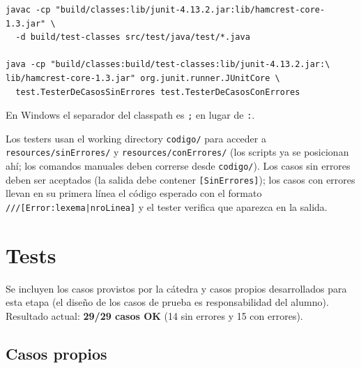 \documentclass[11pt,a4paper]{article}
\begin{document}
{\footnotesize
\begin{verbatim}
javac -cp "build/classes:lib/junit-4.13.2.jar:lib/hamcrest-core-1.3.jar" \
  -d build/test-classes src/test/java/test/*.java

java -cp "build/classes:build/test-classes:lib/junit-4.13.2.jar:\
lib/hamcrest-core-1.3.jar" org.junit.runner.JUnitCore \
  test.TesterDeCasosSinErrores test.TesterDeCasosConErrores
\end{verbatim}
}

En Windows el separador del classpath es \texttt{;} en lugar de \texttt{:}.

Los testers usan el working directory \texttt{codigo/} para acceder a
\texttt{resources/sinErrores/} y \texttt{resources/conErrores/} (los scripts ya se
posicionan ahí; los comandos manuales deben correrse desde \texttt{codigo/}). Los casos
sin errores deben ser aceptados (la salida debe contener \texttt{[SinErrores]}); los casos
con errores llevan en su primera línea el código esperado con el formato
\verb!///[Error:lexema|nroLinea]! y el tester verifica que aparezca en la salida.

\section{Tests}

Se incluyen los casos provistos por la cátedra y casos propios desarrollados para esta
etapa (el diseño de los casos de prueba es responsabilidad del alumno). Resultado actual:
\textbf{29/29 casos OK} (14 sin errores y 15 con errores).

\subsection{Casos propios}
\end{document}
